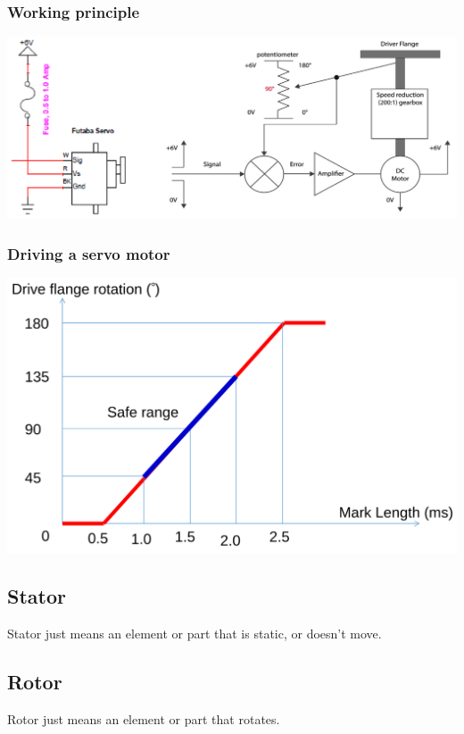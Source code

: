 \documentclass[11pt]{article}
\begin{document}
\subsubsection{Working principle}
\label{sec:orgac13eeb}
\begin{center}
\includegraphics[width=.9\linewidth]{./images/servo-motor-working-principle.png}
\end{center}
\subsubsection{Driving a servo motor}
\label{sec:orgcd8b2d3}
\begin{center}
\includegraphics[width=.9\linewidth]{./images/driving-a-servo-motor.png}
\end{center}
\subsection{Stator}
\label{sec:orgd928ee6}
Stator just means an element or part that is static, or doesn't move.
\subsection{Rotor}
\label{sec:org511791b}
Rotor just means an element or part that rotates.
\end{document}
